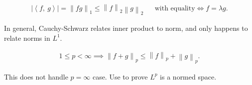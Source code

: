 \begin{proposition}

\begin{align*}  
{\left\lvert {{\left\langle {f},~{g} \right\rangle}} \right\rvert} = {\left\lVert {fg} \right\rVert}_{1} \leq {\left\lVert {f} \right\rVert}_{2} {\left\lVert {g} \right\rVert}_{2}
&& \text{with equality} \iff f = \lambda g
.\end{align*}

\end{proposition}

\begin{remark}

In general, Cauchy-Schwarz relates inner product to norm, and only
happens to relate norms in \(L^1\).

\end{remark}

\begin{proposition}

\begin{align*}  
1\leq p < \infty \implies {\left\lVert {f+g} \right\rVert}_{p} \leq {\left\lVert {f} \right\rVert}_{p}+ {\left\lVert {g} \right\rVert}_{p}
.\end{align*}

\end{proposition}

\begin{remark}

This does not handle \(p=\infty\) case. Use to prove \(L^p\) is a normed
space.

\end{remark}

